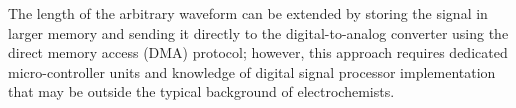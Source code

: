 The length of the arbitrary waveform can be extended by storing the signal in larger memory and sending it directly to the digital-to-analog converter using the direct memory access (DMA) protocol; however, this approach requires dedicated micro-controller units and knowledge of digital signal processor implementation that may be outside the typical background of electrochemists.

